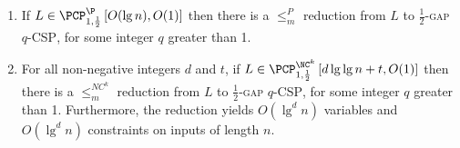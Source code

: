 \documentclass[]{article}
\newcommand{\PCPcs}[5]{\PCP^{#1}_{#2, #3}\left[#4, #5\right]}
\begin{document}
\begin{lemma} \label{lem:constraints}
  \mbox{}
  \begin{enumerate}
  \item If $L \in \PCPcs{\P}{1}{\frac{1}{2}}{O(\lg n)}{O(1)}$ then there is a $\leq_m^P$ reduction from $L$ to \textsc{$\frac{1}{2}$-gap $q$-CSP}, for some integer $q$ greater than 1.
  \item
    For all non-negative integers $d$ and $t$, if $L \in \PCPcs{\NC^k}{1}{\frac{1}{2}}{d \lg \lg n + t}{O(1)}$ then there is a $\leq_m^{NC^k}$ reduction from $L$ to \textsc{$\frac{1}{2}$-gap $q$-CSP}, for some integer $q$ greater than 1.
    Furthermore, the reduction yields $O(\lg^d n)$ variables and $O(\lg^d n)$ constraints on inputs of length $n$.
  \end{enumerate}
\end{lemma}
\end{document}
